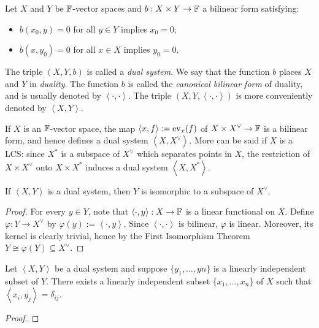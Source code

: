 \begin{definition}\label{def:dual-sys}
	Let $X$ and $Y$ be $\mathbb{F}$-vector spaces and $b:X \times Y \rightarrow \mathbb{F}$ a bilinear form satisfying:
	\mbox{}
	\begin{itemize}[itemsep=1pt,topsep=3pt]
		\item $b(x_0,y) = 0$ for all $y \in Y$ implies $x_0 = 0$;
		\item $b(x,y_0) = 0$ for all $x \in X$ implies $y_0 = 0$.
	\end{itemize}
	The triple $(X,Y,b)$ is called a \emph{dual system}. We say that the function $b$ places $X$ and $Y$ in \emph{duality}. The function $b$ is called the \emph{canonical bilinear form} of duality, and is usually denoted by $ \left<\cdot,\cdot \right>$. The triple $(X,Y, \left<\cdot,\cdot \right>)$ is more conveniently denoted by $\left<X,Y \right>$.
\end{definition}

\begin{example}
	If $X$ is an $\mathbb{F}$-vector space, the map $\left<x,f \right> := \operatorname{ev}_x(f)$ of $X \times X^\vee \rightarrow \mathbb{F}$ is a bilinear form, and hence defines a dual system $\left<X,X^\vee \right>$. More can be said if $X$ is a LCS: since $X^\ast$ is a subspace of $X^\vee$ which separates points in $X$, the restriction of $X \times X^\vee$ onto $X \times X^\ast$ induces a dual system $\left<X,X^\ast \right>$.
\end{example}


\begin{proposition}
	If $\left<X,Y \right>$ is a dual system, then $Y$ is isomorphic to a subspace of $X^\vee$.
\end{proposition}
	\begin{proof}
		For every $y \in Y$, note that $\left<\cdot,y \right>:X \rightarrow \mathbb{F}$ is a linear functional on $X$. Define $\varphi:Y \rightarrow X^\vee$ by $\varphi(y):= \left<\cdot,y \right>$. Since $\left<\cdot,\cdot \right>$ is bilinear, $\varphi$ is linear. Moreover, its kernel is clearly trivial, hence by the First Isomorphism Theorem $Y \cong \varphi(Y) \subseteq X^\vee$.
	\end{proof}

\begin{proposition}
	Let $\left<X,Y \right>$ be a dual system and suppose $\{y_1,\ldots ,yn\}$ is a linearly independent subset of $Y$. There exists a linearly independent subset $\{x_1,\ldots ,x_n\}$ of $X$ such that $\left<x_i,y_j \right> = \delta_{ij}$.
\end{proposition}
	{\color{red}
	\begin{proof}
			
	\end{proof}}

